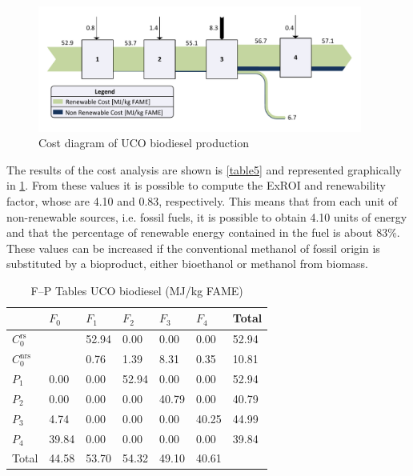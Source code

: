 \documentclass[sustainability,article,submit,moreauthors,pdftex,12pt,a4paper]{mdpi}
\newcommand{\ems}[3][\phantom{\ast}]{\ensuremath{{#2}_{#3}^\mathrm{#1}}}
\begin{document}
\begin{figure}[htpb]
\centering
\includegraphics[width=0.95\textwidth]{Figure2}
\caption{Cost diagram of UCO biodiesel production}
\label{fig2}
\end{figure}

The results of the cost analysis are shown is \cref{table5} and represented graphically in \cref{fig2}. From these values it is possible to compute the ExROI and renewability factor, whose are 4.10 and 0.83, respectively. This means that from each unit of non-renewable sources, i.e. fossil fuels, it is possible to obtain 4.10 units of energy and that the percentage of renewable energy contained in the fuel is about 83\%. These values can be increased if the conventional methanol of fossil origin is substituted by a bioproduct, either bioethanol or methanol from biomass.

\begin{table}[htbp]
\centering 
\caption[F--P Tables UCO biodiesel]{F--P Tables UCO biodiesel (MJ/kg FAME)}
\begin{tabularx}{0.9\textwidth}{ZZZZZZZ}
\toprule
 & $F_0$  & $F_1$ & $F_2$ & $F_3$ & $F_4$ & Total \\
\midrule
\ems[rs]{C}{0} &       & 52.94 & 0.00  & 0.00  & 0.00  & 52.94 \\
\ems[nrs]{C}{0} &       & 0.76  & 1.39  & 8.31  & 0.35  & 10.81 \\
$P_1$ & 0.00  & 0.00  & 52.94 & 0.00  & 0.00  & 52.94 \\
$P_2$ & 0.00  & 0.00  & 0.00  & 40.79 & 0.00  & 40.79 \\
$P_3$ & 4.74  & 0.00  & 0.00  & 0.00  & 40.25 & 44.99 \\
$P_4$ & 39.84 & 0.00  & 0.00  & 0.00  & 0.00  & 39.84 \\
\midrule
Total & 44.58 & 53.70 & 54.32 & 49.10 & 40.61 &  \\
\bottomrule
\end{tabularx}%
\label{table4}%
\end{table}%
\end{document}
